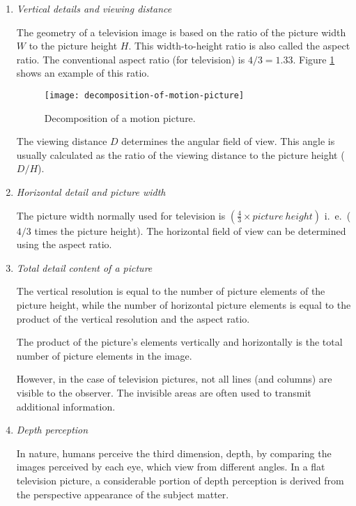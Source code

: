 \begin{enumerate}
	\item \textit{Vertical details and viewing distance}
	
	The geometry of a television image is based on the ratio of the picture width $ W $ to the picture height $ H $. This width-to-height ratio is also called the aspect ratio. The	conventional aspect ratio (for television) is $ 4/3=1.33 $. Figure {\ref{fig:decomposition-of-motion-picture}} shows an
	example of this ratio.

\begin{figure}[h]
	\centering
	\texttt{[image: decomposition-of-motion-picture]}
	\caption{Decomposition of a motion picture.}{\label{fig:decomposition-of-motion-picture}}
\end{figure}
The viewing distance $ D $ determines the angular field of view. This angle is usually calculated as the ratio of the viewing distance to the picture height ($ D/H $).

\item \textit{Horizontal detail and picture width}

The picture width normally used for television is $ (\frac{4}{3}  \times picture \:height )$ i.\ e.\ ($ 4/3 $ times the picture height). The horizontal field of view can be determined using the aspect ratio.

\item \textit{Total detail content of a picture}

The vertical resolution is equal to the number of picture elements of the picture height, while the number of horizontal picture elements is equal to the product of the vertical resolution and the aspect ratio. 

The product of the picture’s elements	vertically and horizontally is the total number of picture elements in the image. 

However, in the case of television pictures, not all lines (and columns) are visible to the observer. The invisible areas are often used to transmit additional information.

\item \textit{Depth perception}

In nature, humans perceive the third dimension, depth, by comparing the images perceived by each eye, which view from different angles. In a flat television picture, a considerable portion of depth perception is derived from the perspective appearance of the subject matter. 


\end{enumerate}
